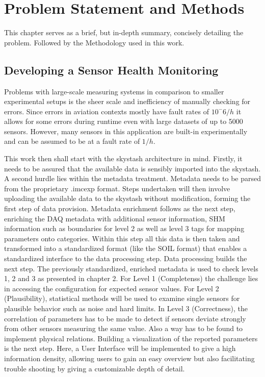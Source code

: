 \chapter{Problem Statement and Methods}

This chapter serves as a brief, but in-depth summary, concisely detailing the problem. Followed by the Methodology used in this work.

\section{Developing a Sensor Health Monitoring}

Problems with large-scale measuring systems in comparison to smaller experimental setups is the sheer scale and inefficiency of manually checking for errors. Since errors in aviation contexts mostly have fault rates of $10^-6/h$ it allows for some errors during runtime even with large datasets of up to 5000 sensors. However, many sensors in this application are built-in experimentally and can be assumed to be at a fault rate of $1/h$.

This work then shall start with the skystash architecture in mind. Firstly, it needs to be assured that the available data is sensibly imported into the skystash. A second hurdle lies within the metadata treatment. Metadata needs to be parsed from the proprietary .imcexp format. Steps undertaken will then involve uploading the available data to the skystash without modification, forming the first step of data provision.
Metadata enrichment follows as the next step, enriching the DAQ metadata with additional sensor information, SHM information such as boundaries for level 2 as well as level 3 tags for mapping parameters onto categories. Within this step all this data is then taken and transformed into a standardized format (like the SOIL format) that enables a standardized interface to the data processing step.
Data processing builds the next step. The previously standardized, enriched metadata is used to check levels 1, 2 and 3 as presented in chapter 2. For Level 1 (Completenss) the challenge lies in accessing the configuration for expected sensor values. For Level 2 (Plausibility), statistical methods will be used to examine single sensors for plausible behavior such as noise and hard limits. In Level 3 (Correctness), the correlation of parameters has to be made to detect if sensors deviate strongly from other sensors measuring the same value. Also a way has to be found to implement physical relations.
Building a visualization of the reported parameters is the next step. Here, a User Interface will be implemented to give a high information density, allowing users to gain an easy overview but also facilitating trouble shooting by giving a customizable depth of detail.


